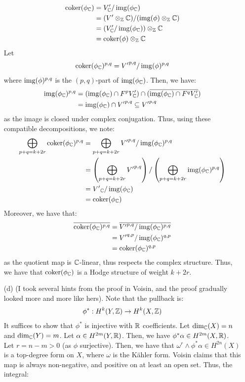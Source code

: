 \documentclass[12pt]{article}
\begin{document}
\begin{solution}
\begin{enumerate}
\begin{align*}
            \coker(\phi_\C) &= V'_\C / \img(\phi_\C) \\
            &= (V' \otimes_\Z \C)/(\img(\phi) \otimes_\Z \C) \\
            &= (V'_\C / \img(\phi_\C)) \otimes_\Z \C \\
            &= \coker(\phi) \otimes_\Z \C
        \end{align*}
        Let
        \[ \coker(\phi_\C)^{p,q} = {V'}^{p,q} / \img(\phi)^{p,q}\]
        where $\img(\phi)^{p,q}$ is the $(p,q)$-part of $\img(\phi_\C)$. Then, we have:
        \begin{align*}
            \img(\phi_\C)^{p,q} &= (\img(\phi_\C) \cap F^{p} V'_\C) \cap (\overline{\img(\phi_\C) \cap F^{q} V'_\C}) \\
            &= \img(\phi_\C) \cap {V'}^{p,q} \subseteq {V'}^{p,q}
        \end{align*}
        as the image is closed under complex conjugation. Thus, using these compatible decompositions, we note:  
        \begin{align*}
            \bigoplus_{p+q = k+2r} \coker(\phi_\C)^{p,q} &= \bigoplus_{p+q = k+2r} {V'}^{p,q} / \img(\phi_\C)^{p,q} \\
            &= \left(\bigoplus_{p+q = k+2r} {V'}^{p,q}\right)/ \left(\bigoplus_{p+q = k+2r} \img(\phi_\C)^{p, q}  \right) \\
            &= {V'}_\C / \img(\phi_\C) \\
            &= \coker(\phi_\C)
        \end{align*}
        Moreover, we have that:
        \begin{align*}
            \overline{\coker(\phi_\C)^{p,q}} &= \overline{{V'}^{p,q} / \img(\phi_\C)^{p,q}} \\
            &= {V'}^{q,p} / \img(\phi_\C)^{q,p} \\
            &= \coker(\phi_\C)^{q, p}            
        \end{align*}
        as the quotient map is $\C$-linear, thus respects the complex structure. Thus, we have that $\coker(\phi_\C)$ is a Hodge structure of weight $k+2r$.
        \item[(d)] (I took several hints from the proof in Voisin, and the proof gradually looked more and more like hers). \bbni 
        Note that the pullback is: 
        \[ \phi^*: H^k(Y, \mathbb Z) \to H^k(X, \mathbb Z)\]
        It suffices to show that $\phi^*$ is injective with $\mathbb R$ coefficients. Let $\dim_\mathbb C(X) = n$ and $\dim_\mathbb C(Y) = m$. Let $\alpha \in H^{2m}(Y, \mathbb R)$. Then, we have $\phi^*\alpha \in H^{2m}(X, \mathbb R)$. Let $r = n-m > 0$ (as $\phi$ surjective). Then, we have that $\omega^r \wedge \phi^*\alpha \in H^{2n}(X)$ is a top-degree form on $X$, where $\omega$ is the K\"ahler form. Voisin claims that this map is always non-negative, and positive on at least an open set. Thus, the integral:

\end{enumerate}
\end{solution}
\end{document}
